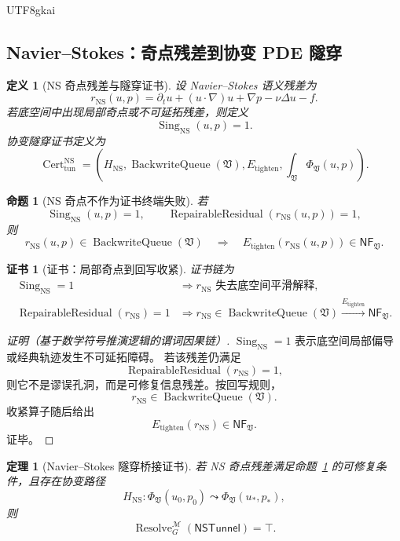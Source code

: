 \documentclass[12pt]{article}
\newtheorem{definition}{定义}[section]
\newtheorem{theorem}{定理}[section]
\newtheorem{proposition}{命题}[section]
\newtheorem{Certificate}{证书}[section]
\newcommand{\Vsys}{\mathfrak V}
\newcommand{\NF}{\mathsf{NF}}
\DeclareMathOperator{\Cert}{Cert}
\DeclareMathOperator{\Resolve}{Resolve}
\DeclareMathOperator{\BackwriteQueue}{BackwriteQueue}
\DeclareMathOperator{\RepairableResidual}{RepairableResidual}
\DeclareMathOperator{\Sing}{Sing}
\begin{document}
\begin{CJK*}{UTF8}{gkai}
\subsection{Navier--Stokes：奇点残差到协变 PDE 隧穿}
\label{subsec:tex59-m4-ns}

\begin{definition}[NS 奇点残差与隧穿证书]
\label{def:tex59-ns-singular-residual}
设 Navier--Stokes 语义残差为
\[
  r_{\mathrm{NS}}(u,p)
  =
  \partial_t u+(u\cdot\nabla)u+\nabla p-\nu\Delta u-f.
\]
若底空间中出现局部奇点或不可延拓残差，则定义
\[
  \Sing_{\mathrm{NS}}(u,p)=1.
\]
协变隧穿证书定义为
\[
  \Cert_{\mathrm{tun}}^{\mathrm{NS}}
  =
  \left(
  H_{\mathrm{NS}},
  \BackwriteQueue(\Vsys),
  E_{\mathrm{tighten}},
  \int_{\Vsys}\Phi_{\Vsys}(u,p)
  \right).
\]
\end{definition}

\begin{proposition}[NS 奇点不作为证书终端失败]
\label{prop:tex59-ns-singularity-tunnel}
若
\[
  \Sing_{\mathrm{NS}}(u,p)=1,
  \qquad
  \RepairableResidual(r_{\mathrm{NS}}(u,p))=1,
\]
则
\[
  r_{\mathrm{NS}}(u,p)\in\BackwriteQueue(\Vsys)
  \quad\Longrightarrow\quad
  E_{\mathrm{tighten}}(r_{\mathrm{NS}}(u,p))\in\NF_{\Vsys}.
\]
\end{proposition}

\begin{Certificate}[证书：局部奇点到回写收紧]
\label{cert:tex59-ns-singularity-tunnel}
证书链为
\[
  \begin{aligned}
  \Sing_{\mathrm{NS}}=1
  &\Longrightarrow
  r_{\mathrm{NS}}\text{ 失去底空间平滑解释},\\
  \RepairableResidual(r_{\mathrm{NS}})=1
  &\Longrightarrow
  r_{\mathrm{NS}}\in\BackwriteQueue(\Vsys)
  \xrightarrow{E_{\mathrm{tighten}}}
  \NF_{\Vsys}.
  \end{aligned}
\]
\end{Certificate}

\begin{proof}[证明（基于数学符号推演逻辑的谓词因果链）]
\(\Sing_{\mathrm{NS}}=1\) 表示底空间局部偏导或经典轨迹发生不可延拓障碍。
若该残差仍满足
\[
  \RepairableResidual(r_{\mathrm{NS}})=1,
\]
则它不是谬误孔洞，而是可修复信息残差。按回写规则，
\[
  r_{\mathrm{NS}}\in\BackwriteQueue(\Vsys).
\]
收紧算子随后给出
\[
  E_{\mathrm{tighten}}(r_{\mathrm{NS}})\in\NF_{\Vsys}.
\]
证毕。
\end{proof}

\begin{theorem}[Navier--Stokes 隧穿桥接证书]
\label{thm:tex59-m4-ns-tunnel}
若 NS 奇点残差满足命题~\ref{prop:tex59-ns-singularity-tunnel} 的可修复条件，且存在协变路径
\[
  H_{\mathrm{NS}}:\Phi_{\Vsys}(u_0,p_0)\leadsto\Phi_{\Vsys}(u_\ast,p_\ast),
\]
则
\[
  \Resolve_G^{\mathcal M}(\mathsf{NSTunnel})=\top.
\]
\end{theorem}


\end{CJK*}
\end{document}
